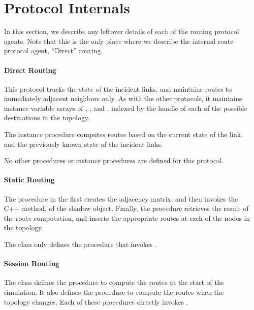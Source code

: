 \section{Protocol Internals}
\label{sec:protocol-internals}

In this section, we describe any leftover details of each of the routing
protocol agents.
Note that this is the only place where we describe the
internal route protocol agent, ``Direct'' routing.

\paragraph{Direct Routing}
This protocol tracks the state of the incident links,
and maintains routes to immediately adjacent neighbors only.
As with the other protocols, it maintains instance variable arrays
of , , and , indexed by 
the handle of each of the possible destinations in the topology.

The instance procedure
computes routes based on the current state of the link, and the previously
known state of the incident links.

No other procedures or instance procedures are defined for this protocol.

\paragraph{Static Routing}
The procedure
in the 
first creates the adjacency matrix, and then
invokes the C++ method,  of the shadow object.
Finally, the procedure retrieves the result of the route computation,
and inserts the appropriate routes at each of the nodes in the topology.

The class only defines the procedure
that invokes .

\paragraph{Session Routing}
The class defines the procedure
to compute the routes at the start of the simulation.
It also defines the procedure
to compute the routes when the topology changes.
Each of these procedures directly invokes .

